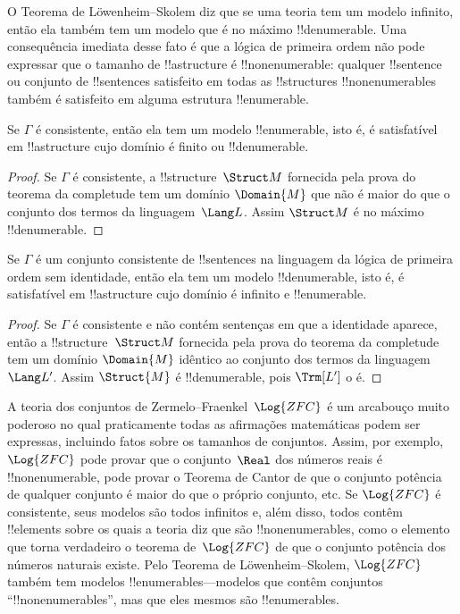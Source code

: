 \documentclass[../../../include/open-logic-section]{subfiles}
\begin{document}

O Teorema de L\"owenheim--Skolem diz que se uma teoria tem um modelo
infinito, então ela também tem um modelo que é no máximo
!!{denumerable}. Uma consequência imediata desse fato é que a lógica de
primeira ordem não pode expressar que o tamanho de !!a{structure} é
!!{nonenumerable}: qualquer !!{sentence} ou conjunto de !!{sentence}s
satisfeito em todas as !!{structure}s !!{nonenumerable}s também é
satisfeito em alguma estrutura !!{enumerable}.

\begin{thm}
 Se $\Gamma$ é consistente, então ela tem
um modelo !!{enumerable}, isto é, é satisfatível em !!a{structure}
cujo domínio é finito ou !!{denumerable}.
\end{thm}

\begin{proof}
Se $\Gamma$ é consistente, a !!{structure}~$\Struct M$ fornecida pela
prova do teorema da completude tem um domínio $\Domain{M}$ que não é
maior do que o conjunto dos termos da linguagem~$\Lang L$. Assim
$\Struct M$ é no máximo !!{denumerable}.
\end{proof}

\begin{thm}
 Se $\Gamma$ é um conjunto consistente de
!!{sentence}s na linguagem da lógica de primeira ordem sem identidade,
então ela tem um modelo !!{denumerable}, isto é, é satisfatível em
!!a{structure} cujo domínio é infinito e !!{enumerable}.
\end{thm}

\begin{proof}
Se $\Gamma$ é consistente e não contém sentenças em que a identidade
aparece, então a !!{structure}~$\Struct M$ fornecida pela prova do
teorema da completude tem um domínio $\Domain{M}$ idêntico ao conjunto
dos termos da linguagem~$\Lang L'$. Assim $\Struct{M}$ é
!!{denumerable}, pois $\Trm[L']$ o é.
\end{proof}

\begin{ex}
A teoria dos conjuntos de Zermelo--Fraenkel~$\Log{ZFC}$ é um arcabouço
muito poderoso no qual praticamente todas as afirmações matemáticas
podem ser expressas, incluindo fatos sobre os tamanhos de conjuntos.
Assim, por exemplo, $\Log{ZFC}$ pode provar que o conjunto~$\Real$ dos
números reais é !!{nonenumerable}, pode provar o Teorema de Cantor de
que o conjunto potência de qualquer conjunto é maior do que o próprio
conjunto, etc.  Se $\Log{ZFC}$ é consistente, seus modelos são todos
infinitos e, além disso, todos contêm !!{element}s sobre os quais a
teoria diz que são !!{nonenumerable}s, como o elemento que torna
verdadeiro o teorema de~$\Log{ZFC}$ de que o conjunto potência dos
números naturais existe. Pelo Teorema de L\"owenheim--Skolem,
$\Log{ZFC}$ também tem modelos !!{enumerable}s---modelos que contêm
conjuntos ``!!{nonenumerable}s'', mas que eles mesmos são
!!{enumerable}s.
\end{ex}
\end{document}
